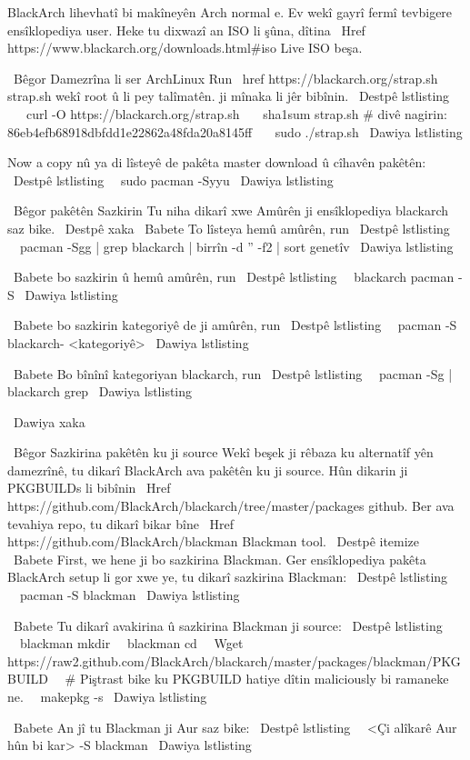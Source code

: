 BlackArch lihevhatî bi makîneyên Arch normal e. Ev wekî gayrî fermî tevbigere
ensîklopediya user. Heke tu dixwazî ​​an ISO li şûna, dîtina
\ Href {https://www.blackarch.org/downloads.html#iso} {Live ISO} beşa.

\ Bêgor {Damezrîna li ser ArchLinux}
Run \ href {https://blackarch.org/strap.sh} {strap.sh} wekî root û li pey
talîmatên. ji mînaka li jêr bibînin.
\ Destpê {lstlisting}
   curl -O https://blackarch.org/strap.sh
   sha1sum strap.sh # divê nagirin: 86eb4efb68918dbfdd1e22862a48fda20a8145ff
   sudo ./strap.sh
\ Dawiya {lstlisting}

Now a copy nû ya di lîsteyê de pakêta master download û cîhavên pakêtên:
\ Destpê {lstlisting}
  sudo pacman -Syyu
\ Dawiya {lstlisting}


\ Bêgor {pakêtên Sazkirin}
Tu niha dikarî xwe Amûrên ji ensîklopediya blackarch saz bike.
\ Destpê {xaka}
\ Babete To lîsteya hemû amûrên, run
\ Destpê {lstlisting}
  pacman -Sgg | grep blackarch | birrîn -d '' -f2 | sort genetîv
\ Dawiya {lstlisting}

\ Babete bo sazkirin û hemû amûrên, run
\ Destpê {lstlisting}
  blackarch pacman -S
\ Dawiya {lstlisting}

\ Babete bo sazkirin kategoriyê de ji amûrên, run
\ Destpê {lstlisting}
  pacman -S blackarch- <kategoriyê>
\ Dawiya {lstlisting}

\ Babete Bo bînînî kategoriyan blackarch, run
\ Destpê {lstlisting}
  pacman -Sg | blackarch grep
\ Dawiya {lstlisting}

\ Dawiya {xaka}

\ Bêgor {Sazkirina pakêtên ku ji source}
Wekî beşek ji rêbaza ku alternatîf yên damezrînê, tu dikarî BlackArch ava
pakêtên ku ji source. Hûn dikarin ji PKGBUILDs li bibînin
\ Href {https://github.com/BlackArch/blackarch/tree/master/packages} {github}. Ber
ava tevahiya repo, tu dikarî bikar bîne
\ Href {https://github.com/BlackArch/blackman} {Blackman} tool.
\ Destpê {itemize}
\ Babete First, we hene ji bo sazkirina Blackman. Ger ensîklopediya pakêta BlackArch
setup li gor xwe ye, tu dikarî sazkirina Blackman:
\ Destpê {lstlisting}
  pacman -S blackman
\ Dawiya {lstlisting}

\ Babete Tu dikarî avakirina û sazkirina Blackman ji source:
\ Destpê {lstlisting}
  blackman mkdir
  blackman cd
  Wget https://raw2.github.com/BlackArch/blackarch/master/packages/blackman/PKGBUILD
  # Piştrast bike ku PKGBUILD hatiye dîtin maliciously bi ramaneke ne.
  makepkg -s
\ Dawiya {lstlisting}

\ Babete An jî tu Blackman ji Aur saz bike:
\ Destpê {lstlisting}
  <Çi alîkarê Aur hûn bi kar> -S blackman
\ Dawiya {lstlisting}

